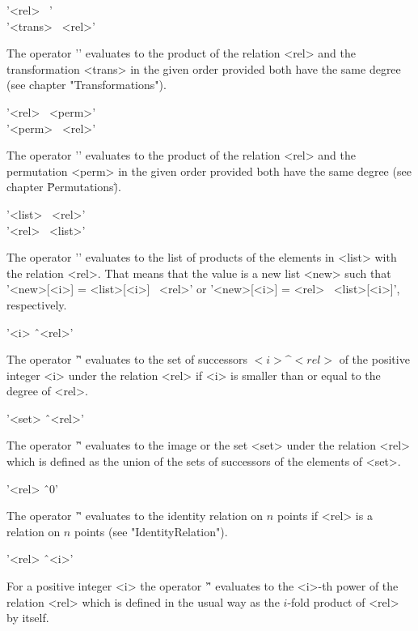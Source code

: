 \vspace{5mm}
'<rel> \*\ <trans>'\\
'<trans> \*\ <rel>'%

The operator '\*' evaluates to the product of the  relation <rel> and the
transformation  <trans> in  the given order  provided  both have the same
degree (see chapter "Transformations").

\vspace{5mm}
'<rel> \*\ <perm>'\\
'<perm> \*\ <rel>'%

The operator '\*' evaluates to the product of  the relation <rel> and the
permutation <perm> in the given order provided  both have the same degree
(see chapter \"Permutations\").

\vspace{5mm}
'<list> \*\ <rel>' \\
'<rel> \*\ <list>'%

The operator  '\*' evaluates to  the list of  products of the elements in
<list> with the relation <rel>.  That means that the value  is a new list
<new> such that  '<new>[<i>] =  <list>[<i>] \*\  <rel>' or  '<new>[<i>] =
<rel> \*\ <list>[<i>]', respectively.

\vspace{5mm}
'<i> \^\ <rel>'%

The operator '\^' evaluates to the  set of successors $<i>\^<rel>$ of the
positive integer <i> under  the relation <rel>  if <i> is smaller than or
equal to the degree of <rel>.

\vspace{5mm}
'<set> \^\ <rel>'%

The operator '\^'  evaluates  to the image   or the set <set>  under  the
relation <rel> which is defined as the union of the sets of successors of
the elements of <set>.

\vspace{5mm}
'<rel> \^\ 0'

The operator '\^' evaluates to  the identity  relation  on $n$ points  if
<rel> is a relation on $n$ points (see "IdentityRelation").

\vspace{5mm}
'<rel> \^\ <i>'%

For a  positive integer  <i> the operator   '\^' evaluates to the  <i>-th
power of the  relation <rel> which  is defined  in the  usual  way as the
$i$-fold product of <rel> by itself.

